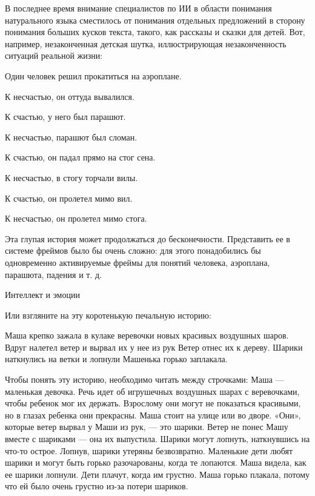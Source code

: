 \documentclass[../main.tex]{subfiles}
\begin{document}
В последнее время внимание специалистов по ИИ в области понимания натурального языка сместилось от понимания отдельных предложений в сторону понимания больших кусков текста, такого, как рассказы и сказки для детей. Вот, например, незаконченная детская шутка, иллюстрирующая незаконченность ситуаций реальной жизни:

Один человек решил прокатиться на аэроплане.

К несчастью, он оттуда вывалился.

К счастью, у него был парашют.

К несчастью, парашют был сломан.

К счастью, он падал прямо на стог сена.

К несчастью, в стогу торчали вилы.

К счастью, он пролетел мимо вил.

К несчастью, он пролетел мимо стога.

Эта глупая история может продолжаться до бесконечности. Представить ее в системе фреймов было бы очень сложно: для этого понадобились бы одновременно активируемые фреймы для понятий человека, аэроплана, парашюта, падения и т. д.

Интеллект и эмоции

Или взгляните на эту коротенькую печальную историю:

Маша крепко зажала в кулаке веревочки новых красивых воздушных шаров. Вдруг налетел ветер и вырвал их у нее из рук Ветер отнес их к дереву. Шарики наткнулись на ветки и лопнули Машенька горько заплакала.

Чтобы понять эту историю, необходимо читать между строчками: Маша --- маленькая девочка. Речь идет об игрушечных воздушных шарах с веревочками, чтобы ребенок мог их держать. Взрослому они могут не показаться красивыми, но в глазах ребенка они прекрасны. Маша стоит на улице или во дворе. «Они», которые ветер вырвал у Маши из рук, --- это шарики. Ветер не понес Машу вместе с шариками --- она их выпустила. Шарики могут лопнуть, наткнувшись на что-то острое. Лопнув, шарики утеряны безвозвратно. Маленькие дети любят шарики и могут быть горько разочарованы, когда те лопаются. Маша видела, как ее шарики лопнули. Дети плачут, когда им грустно. Маша горько плакала, потому что ей было очень грустно из-за потери шариков.
\end{document}
